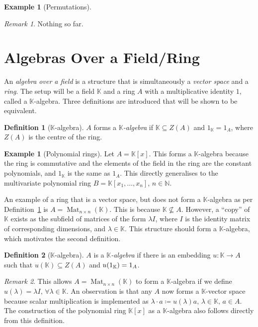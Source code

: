 \documentclass{article}
\theoremstyle{definition}
\newtheorem{Definition}{Definition}
\newtheorem{Example}{Example}
\newtheorem*{Example*}{Example}
\theoremstyle{remark}
\newtheorem*{Remark*}{Remark}
\theoremstyle{underline}
\theoremstyle{underline}
\DeclareMathOperator{\Mat}{Mat}
\begin{document}
\begin{Example}[Permutations]
		\begin{Remark*}
			Nothing so far.
		\end{Remark*}
	\end{Example}
	
	\section{Algebras Over a Field/Ring}
	
	An \emph{algebra over a field} is a structure that is simultaneously a \emph{vector space} and a \emph{ring}. The setup will be a field $\mathbb K$ and a ring $A$ with a multiplicative identity $1$, called a $\mathbb K$-algebra.
	Three definitions are introduced that will be shown to be equivalent.
	
	\begin{Definition}[$\mathbb K$-algebra]\label{def:k-Alg-1}
		$A$ forms a $\mathbb K$\emph{-algebra} if $\mathbb K \subseteq Z(A)$ and $1_{\mathbb K} = 1_A$, where $Z(A)$ is the centre of the ring.
	\end{Definition}
	
	\begin{Example*}[Polynomial rings]
		Let $A = \mathbb K[x]$. This forms a $\mathbb K$-algebra because the ring is commutative and the elements of the field in the ring are the constant polynomials, and $1_{\mathbb K}$ is the same as $1_A$. This directly generalises to the multivariate polynomial ring $B = \mathbb K[x_1,\ldots,x_n]$, $n \in \mathbb N$.
	\end{Example*}
	
	An example of a ring that is a vector space, but does not form a $\mathbb K$-algebra as per Definition~\ref{def:k-Alg-1} is $A = \Mat_{n\times n}(\mathbb K)$. This is because $\mathbb K \not\subseteq A$. However, a ``copy'' of $\mathbb K$ exists as the subfield of matrices of the form $\lambda I$, where $I$ is the identity matrix of corresponding dimensions, and $\lambda \in \mathbb K$. This structure should form a $\mathbb K$-algebra, which motivates the second definition.
	
	\begin{Definition}[$\mathbb K$-algebra]
		$A$ is a $\mathbb K$\emph{-algebra} if there is an embedding $u \colon \mathbb K \to A$ such that $u(\mathbb K) \subseteq Z(A)$ and $u\pqty{1_{\mathbb K}} = 1_A $.
	\end{Definition}
	
	\begin{Remark*}
		This allows $A = \Mat_{n\times n}(\mathbb K)$ to form a $\mathbb K$-algebra if we define $u(\lambda) = \lambda I,\, \forall \lambda \in \mathbb K$. An observation is that any $A$ now forms a $\mathbb K$-vector space because scalar multiplication is implemented as $\lambda \cdot a \coloneqq u(\lambda)a,\, \lambda \in \mathbb K,\, a \in A$. The construction of the polynomial ring $\mathbb K[x]$ as a $\mathbb K$-algebra also follows directly from this definition.
	\end{Remark*}
	
\end{document}
